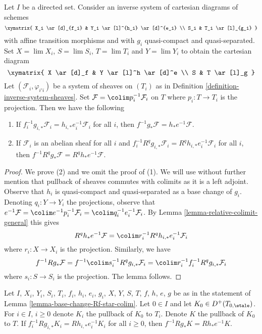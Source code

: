 \begin{lemma}
\label{lemma-base-change-Rf-star-colim}
Let $I$ be a directed set. Consider an inverse system of
cartesian diagrams of schemes
$$
\xymatrix{
X_i \ar[d]_{f_i} & Y_i \ar[l]^{h_i} \ar[d]^{e_i} \\
S_i & T_i \ar[l]_{g_i}
}
$$
with affine transition morphisms and with $g_i$ quasi-compact and
quasi-separated. Set $X = \lim X_i$,
$S = \lim S_i$, $T = \lim T_i$ and $Y = \lim Y_i$ to
obtain the cartesian diagram
$$
\xymatrix{
X \ar[d]_f & Y \ar[l]^h \ar[d]^e \\
S & T \ar[l]_g
}
$$
Let $(\mathcal{F}_i, \varphi_{i'i})$ be a system of sheaves on
$(T_i)$ as in Definition \ref{definition-inverse-system-sheaves}. Set
$\mathcal{F} = \colim p_i^{-1}\mathcal{F}_i$ on $T$
where $p_i : T \to T_i$ is the projection.
Then we have the following
\begin{enumerate}
\item If $f_i^{-1}g_{i, *}\mathcal{F}_i = h_{i, *}e_i^{-1}\mathcal{F}_i$
for all $i$, then
$f^{-1}g_*\mathcal{F} = h_*e^{-1}\mathcal{F}$.
\item If $\mathcal{F}_i$ is an abelian sheaf for all $i$ and
$f_i^{-1}R^qg_{i, *}\mathcal{F}_i = R^qh_{i, *}e_i^{-1}\mathcal{F}_i$
for all $i$, then
$f^{-1}R^qg_*\mathcal{F} = R^qh_*e^{-1}\mathcal{F}$.
\end{enumerate}
\end{lemma}

\begin{proof}
We prove (2) and we omit the proof of (1). We will use without further
mention that pullback of sheaves commutes with colimits as it is a
left adjoint. Observe that $h_i$ is quasi-compact and quasi-separated as a
base change of $g_i$.
Denoting $q_i : Y \to Y_i$ the projections, observe that
$e^{-1}\mathcal{F} = \colim e^{-1}p_i^{-1}\mathcal{F}_i =
\colim q_i^{-1}e_i^{-1}\mathcal{F}_i$.
By Lemma \ref{lemma-relative-colimit-general}
this gives
$$
R^qh_*e^{-1}\mathcal{F} = \colim r_i^{-1}R^qh_{i, *}e_i^{-1}\mathcal{F}_i
$$
where $r_i : X \to X_i$ is the projection.
Similarly, we have
$$
f^{-1}Rg_*\mathcal{F} =
f^{-1}\colim s_i^{-1}R^qg_{i, *}\mathcal{F}_i =
\colim r_i^{-1}f_i^{-1}R^qg_{i, *}\mathcal{F}_i
$$
where $s_i : S \to S_i$ is the projection. The lemma follows.
\end{proof}

\begin{lemma}
\label{lemma-base-change-Rf-star-colim-complexes}
Let $I$, $X_i$, $Y_i$, $S_i$, $T_i$, $f_i$, $h_i$, $e_i$, $g_i$,
$X$, $Y$, $S$, $T$, $f$, $h$, $e$, $g$ be as in the statement
of Lemma \ref{lemma-base-change-Rf-star-colim}.
Let $0 \in I$ and let $K_0 \in D^+(T_{0, \etale})$.
For $i \in I$, $i \geq 0$ denote $K_i$ the pullback of
$K_0$ to $T_i$. Denote $K$ the pullback of $K_0$ to $T$.
If $f_i^{-1}Rg_{i, *}K_i = Rh_{i, *}e_i^{-1}K_i$
for all $i \geq 0$, then $f^{-1}Rg_*K = Rh_*e^{-1}K$.
\end{lemma}

